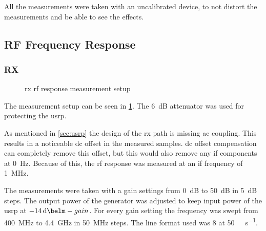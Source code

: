 \documentclass[12pt,a4paper,parskip=full,abstracton]{scrartcl}
\begin{document}
All the measurements were taken with an uncalibrated device, to not distort the measurements
and be able to see the effects.

\subsection{RF Frequency Response}
\subsubsection{RX}
\label{sec:rfrx}
\begin{figure}[htb]
    \centering
    \caption{\gls{rx} \gls{rf} response measurement setup}
    \label{fig:rxrfsetup}
\end{figure}

The measurement setup can be seen in \cref{fig:rxrfsetup}. The \SI{6}{\deci\bel}
attenuator was used for protecting the \gls{usrp}.

As mentioned in \cref{sec:usrp} the design of the \gls{rx} path is missing \gls{ac}
coupling. This results in a noticeable \gls{dc} offset in the measured samples.
\gls{dc} offset compensation can completely remove this offset, but this would
also remove any \gls{if} components at \SI{0}{\hertz}. Because of this, the
\gls{rf} response was measured at an \gls{if} frequency of
\SI{1}{\mega\hertz}.

The measurements were taken with a gain settings from \SI{0}{\deci\bel} to
\SI{50}{\deci\bel} in \SI{5}{\deci\bel} steps. The output power of the
generator was adjusted to keep input power of the \gls{usrp} at
$\SI{-14}{\deci\belm} - gain$. For every gain setting the
frequency was swept from \SI{400}{\mega\hertz} to \SI{4.4}{\giga\hertz} in
\SI{50}{\mega\hertz} steps. The line format used was \SI{8}{\bit} at
\SI{50}{\mega\samples\per\second}.
\end{document}
